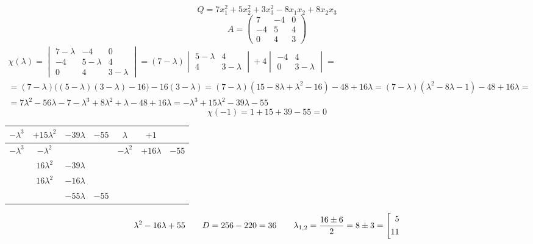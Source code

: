 $$ Q = 7x_1^2 + 5x_2^2 + 3x_3^2 - 8x_1x_2 + 8x_2x_3 $$
$$ A =
\begin{pmatrix}
	7 & -4 & 0 \\
    -4 & 5 & 4 \\
    0 & 4 & 3
\end{pmatrix} $$
\begin{multline*}
    \chi(\lambda) =
    \begin{vmatrix}
        7 - \lambda & -4 & 0 \\
        -4 & 5 - \lambda & 4 \\
        0 & 4 & 3 - \lambda
    \end{vmatrix} = (7 - \lambda)
    \begin{vmatrix}
        5 - \lambda & 4 \\
        4 & 3 - \lambda
    \end{vmatrix} + 4
    \begin{vmatrix}
        -4 & 4 \\
        0 & 3 - \lambda
    \end{vmatrix} = \\
    = (7 - \lambda) \bigg( (5 - \lambda)(3 - \lambda) - 16 \bigg) - 16(3 - \lambda) = (7 - \lambda)(15 - 8\lambda + \lambda^2 - 16) - 48 + 16\lambda = (7 - \lambda)(\lambda^2 - 8\lambda - 1) - 48 + 16\lambda = \\
    = 7\lambda^2 - 56\lambda - 7 - \lambda^3 + 8\lambda^2 + \lambda - 48 + 16\lambda = -\lambda^3 + 15\lambda^2 - 39\lambda - 55
\end{multline*}
$$ \chi(-1) = 1 + 15 + 39 - 55 = 0 $$
\begin{tabular}{c c c c | c c c}
	$ -\lambda^3 $ & $ +15\lambda^2 $ & $ -39\lambda $ & $ -55 $ & $ \lambda $ & $ +1 $ \\
    \hline
    $ -\lambda^3 $ & $ -\lambda^2 $ & & & $ -\lambda^2 $ & $ +16\lambda $ & $ -55 $ \\
    \hline
    & $ 16\lambda^2 $ & $ -39\lambda $ & \\
    & $ 16\lambda^2 $ & $ -16\lambda $ & \\
    \hline
    & & $ -55\lambda $ & $ -55 $
\end{tabular}
$$ \lambda^2 - 16\lambda + 55 \qquad D = 256 - 220 = 36 \qquad \lambda_{1,2} = \half[16 \pm 6] = 8 \pm 3 = \left[
\begin{aligned}
	5 \\
    11
\end{aligned} \right. $$
